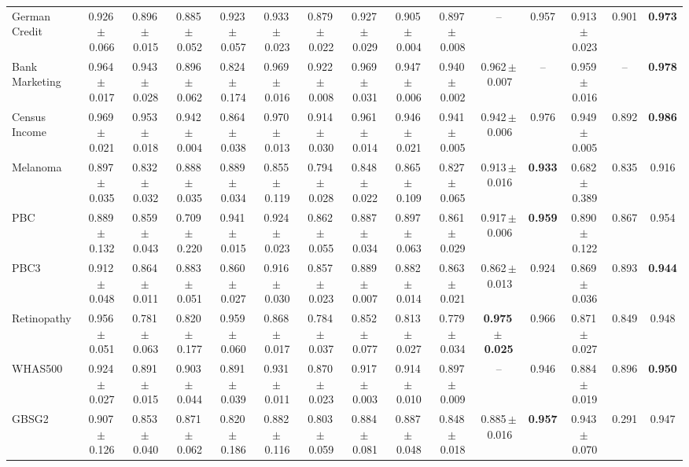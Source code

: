 \documentclass[8pt]{extarticle}
\begin{document}
\begin{longtable}{l*{14}{c}}
German Credit & 0.926\,$\pm$\,0.066 & 0.896\,$\pm$\,0.015 & 0.885\,$\pm$\,0.052 & 0.923\,$\pm$\,0.057 & 0.933\,$\pm$\,0.023 & 0.879\,$\pm$\,0.022 & 0.927\,$\pm$\,0.029 & 0.905\,$\pm$\,0.004 & 0.897\,$\pm$\,0.008 & -- & 0.957 & 0.913\,$\pm$\,0.023 & 0.901 & \textbf{0.973} \\
Bank Marketing & 0.964\,$\pm$\,0.017 & 0.943\,$\pm$\,0.028 & 0.896\,$\pm$\,0.062 & 0.824\,$\pm$\,0.174 & 0.969\,$\pm$\,0.016 & 0.922\,$\pm$\,0.008 & 0.969\,$\pm$\,0.031 & 0.947\,$\pm$\,0.006 & 0.940\,$\pm$\,0.002 & 0.962\,$\pm$\,0.007 & -- & 0.959\,$\pm$\,0.016 & -- & \textbf{0.978} \\
Census Income & 0.969\,$\pm$\,0.021 & 0.953\,$\pm$\,0.018 & 0.942\,$\pm$\,0.004 & 0.864\,$\pm$\,0.038 & 0.970\,$\pm$\,0.013 & 0.914\,$\pm$\,0.030 & 0.961\,$\pm$\,0.014 & 0.946\,$\pm$\,0.021 & 0.941\,$\pm$\,0.005 & 0.942\,$\pm$\,0.006 & 0.976 & 0.949\,$\pm$\,0.005 & 0.892 & \textbf{0.986} \\
Melanoma & 0.897\,$\pm$\,0.035 & 0.832\,$\pm$\,0.032 & 0.888\,$\pm$\,0.035 & 0.889\,$\pm$\,0.034 & 0.855\,$\pm$\,0.119 & 0.794\,$\pm$\,0.028 & 0.848\,$\pm$\,0.022 & 0.865\,$\pm$\,0.109 & 0.827\,$\pm$\,0.065 & 0.913\,$\pm$\,0.016 & \textbf{0.933} & 0.682\,$\pm$\,0.389 & 0.835 & 0.916 \\
PBC & 0.889\,$\pm$\,0.132 & 0.859\,$\pm$\,0.043 & 0.709\,$\pm$\,0.220 & 0.941\,$\pm$\,0.015 & 0.924\,$\pm$\,0.023 & 0.862\,$\pm$\,0.055 & 0.887\,$\pm$\,0.034 & 0.897\,$\pm$\,0.063 & 0.861\,$\pm$\,0.029 & 0.917\,$\pm$\,0.006 & \textbf{0.959} & 0.890\,$\pm$\,0.122 & 0.867 & 0.954 \\
PBC3 & 0.912\,$\pm$\,0.048 & 0.864\,$\pm$\,0.011 & 0.883\,$\pm$\,0.051 & 0.860\,$\pm$\,0.027 & 0.916\,$\pm$\,0.030 & 0.857\,$\pm$\,0.023 & 0.889\,$\pm$\,0.007 & 0.882\,$\pm$\,0.014 & 0.863\,$\pm$\,0.021 & 0.862\,$\pm$\,0.013 & 0.924 & 0.869\,$\pm$\,0.036 & 0.893 & \textbf{0.944} \\
Retinopathy & 0.956\,$\pm$\,0.051 & 0.781\,$\pm$\,0.063 & 0.820\,$\pm$\,0.177 & 0.959\,$\pm$\,0.060 & 0.868\,$\pm$\,0.017 & 0.784\,$\pm$\,0.037 & 0.852\,$\pm$\,0.077 & 0.813\,$\pm$\,0.027 & 0.779\,$\pm$\,0.034 & \textbf{0.975\,$\pm$\,0.025} & 0.966 & 0.871\,$\pm$\,0.027 & 0.849 & 0.948 \\
WHAS500 & 0.924\,$\pm$\,0.027 & 0.891\,$\pm$\,0.015 & 0.903\,$\pm$\,0.044 & 0.891\,$\pm$\,0.039 & 0.931\,$\pm$\,0.011 & 0.870\,$\pm$\,0.023 & 0.917\,$\pm$\,0.003 & 0.914\,$\pm$\,0.010 & 0.897\,$\pm$\,0.009 & -- & 0.946 & 0.884\,$\pm$\,0.019 & 0.896 & \textbf{0.950} \\
GBSG2 & 0.907\,$\pm$\,0.126 & 0.853\,$\pm$\,0.040 & 0.871\,$\pm$\,0.062 & 0.820\,$\pm$\,0.186 & 0.882\,$\pm$\,0.116 & 0.803\,$\pm$\,0.059 & 0.884\,$\pm$\,0.081 & 0.887\,$\pm$\,0.048 & 0.848\,$\pm$\,0.018 & 0.885\,$\pm$\,0.016 & \textbf{0.957} & 0.943\,$\pm$\,0.070 & 0.291 & 0.947 \\

\end{longtable}
\end{document}
